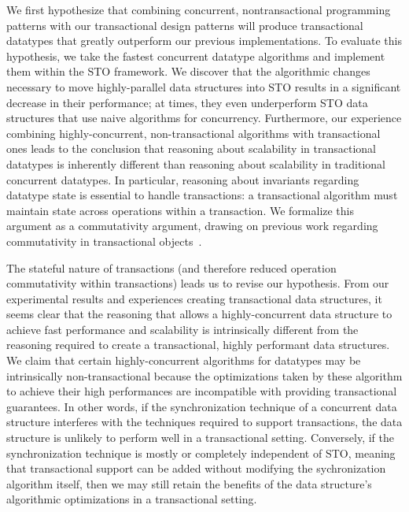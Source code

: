 We first hypothesize that combining concurrent, nontransactional programming patterns with our transactional design patterns will produce transactional datatypes that greatly outperform our previous implementations. To evaluate this hypothesis, we take the fastest concurrent datatype algorithms and implement them within the STO framework. We discover that the algorithmic changes necessary to move highly-parallel data structures into STO results in a significant decrease in their performance; at times, they even underperform STO data structures that use naive algorithms for concurrency.
Furthermore, our experience combining highly-concurrent, non-transactional algorithms with transactional ones leads to the conclusion that reasoning about scalability in transactional datatypes is inherently different than reasoning about scalability in traditional concurrent datatypes. In particular, reasoning about invariants regarding datatype state is essential to handle transactions: a transactional algorithm must maintain state across operations within a transaction. We formalize this argument as a commutativity argument, drawing on previous work regarding commutativity in transactional objects~\cite{weihl}.

The stateful nature of transactions (and therefore reduced operation commutativity within transactions) leads us to revise our hypothesis. From our experimental results and experiences creating transactional data structures, it seems clear that the reasoning that allows a highly-concurrent data structure to achieve fast performance and scalability is intrinsically different from the reasoning required to create a transactional, highly performant data structures. 
We claim that certain highly-concurrent algorithms for datatypes may be intrinsically non-transactional because the optimizations taken by these algorithm to achieve their high performances are incompatible with providing transactional guarantees. In other words, if the synchronization technique of a concurrent data structure interferes with the techniques required to support transactions, the data structure is unlikely to perform well in a transactional setting. Conversely, if the synchronization technique is mostly or completely independent of STO, meaning that transactional support can be added without modifying the sychronization algorithm itself, then we may still retain the benefits of the data structure's algorithmic optimizations in a transactional setting.

